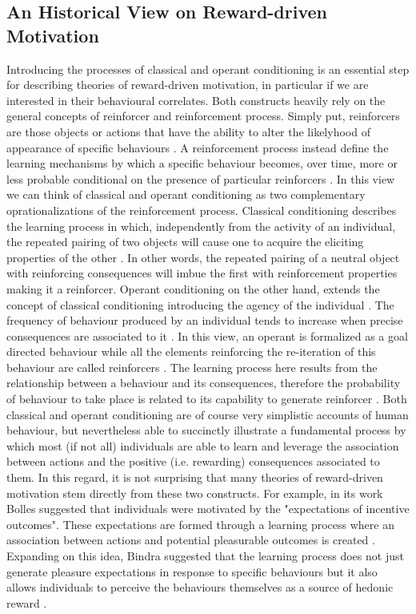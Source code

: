 \subsection{An Historical View on Reward-driven Motivation}
\label{motivation_hist}
Introducing the processes of classical and operant conditioning is an essential step for describing theories of reward-driven motivation, in particular if we are interested in their behavioural correlates. Both constructs heavily rely on the general concepts of reinforcer and reinforcement process. Simply put, reinforcers are those objects or actions that have the ability to alter the likelyhood of appearance of specific behaviours \cite{kling1971woodworth,skinner1953science,squire2012fundamental}. A reinforcement process instead define the learning mechanisms by which a specific behaviour becomes, over time, more or less probable conditional on the presence of particular reinforcers \cite{kling1971woodworth}. In this view we can think of classical and operant conditioning as two complementary oprationalizations of the reinforcement process. Classical conditioning describes the learning process in which, independently from the activity of an individual, the repeated pairing of two objects will cause one to acquire the eliciting properties of the other \cite{squire2012fundamental}. In other words, the repeated pairing of a neutral object with reinforcing consequences will imbue the first with reinforcement properties making it a reinforcer. Operant conditioning on the other hand, extends the concept of classical conditioning introducing the agency of the individual \cite{skinner1953science}. The frequency of behaviour produced by an individual tends to increase when precise consequences are associated to it \cite{skinner1953science}. In this view, an operant is formalized as a goal directed behaviour while all the elements reinforcing the re-iteration of this behaviour are called reinforcers \cite{skinner1953science}. The learning process here results from the relationship between a behaviour and its consequences, therefore the probability of behaviour to take place is related to its capability to generate reinforcer \cite{kling1971woodworth}. Both classical and operant conditioning are of course very simplistic accounts of human behaviour, but nevertheless able to succinctly illustrate a fundamental process by which most (if not all) individuals are able to learn and leverage the association between actions and the positive (i.e. rewarding) consequences associated to them. In this regard, it is not surprising that many theories of reward-driven motivation stem directly from these two constructs. For example, in its work Bolles \cite{bolles1972reinforcement} suggested that individuals were motivated by the "expectations of incentive outcomes". These expectations are formed through a learning process where an association between actions and potential pleasurable outcomes is created \cite{bolles1972reinforcement,berridge2004motivation}. Expanding on this idea, Bindra suggested that the learning process does not just generate pleasure expectations in response to specific behaviours but it also allows individuals to perceive the behaviours themselves as a source of hedonic reward \cite{bindra1978adaptive,berridge2004motivation}.
